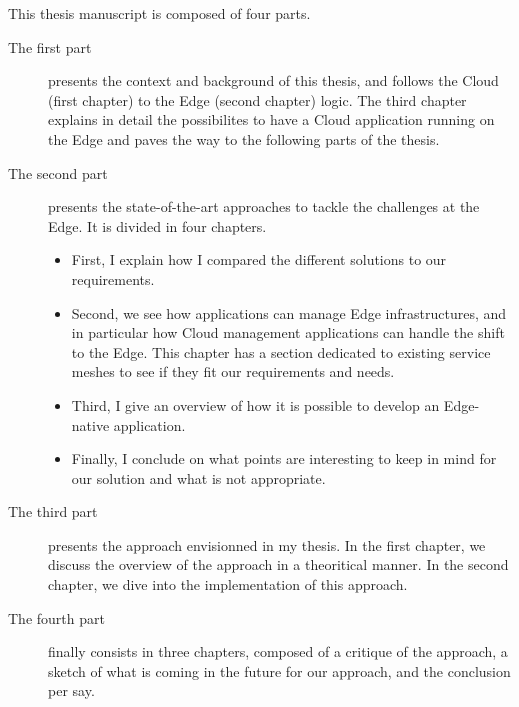 This thesis manuscript is composed of four parts.
%

\begin{description}
\item [The first part] presents the context and background of this
  thesis, and follows the Cloud (first chapter) to the Edge (second
  chapter) logic.
%
  The third chapter explains in detail the possibilites to have a
  Cloud application running on the Edge and paves the way to the
  following parts of the thesis.
%
\item [The second part] presents the state-of-the-art approaches to
  tackle the challenges at the Edge.
%
  It is divided in four chapters.
  \begin{itemize}
  \item First, I explain how I compared the different solutions to our
  requirements.
  \item Second, we see how applications can manage Edge infrastructures, and
  in particular how Cloud management applications can handle the shift
  to the Edge. This chapter has a section dedicated to existing
  service meshes to see if they fit our requirements and needs.
%
  \item Third, I give an overview of how it is possible to develop an
  Edge-native application.
  \item Finally, I conclude on what points are interesting to keep in mind
  for our solution and what is not appropriate.
  \end{itemize}
%

\item [The third part] presents the approach envisionned in my thesis.
%
In the first chapter, we discuss the overview of the approach in a
theoritical manner.
%
In the second chapter, we dive into the implementation of this
approach.
\item [The fourth part] finally consists in three
  chapters, composed of a critique of the approach, a sketch of what
  is coming in the future for our approach, and the conclusion per
  say.
\end{description}
